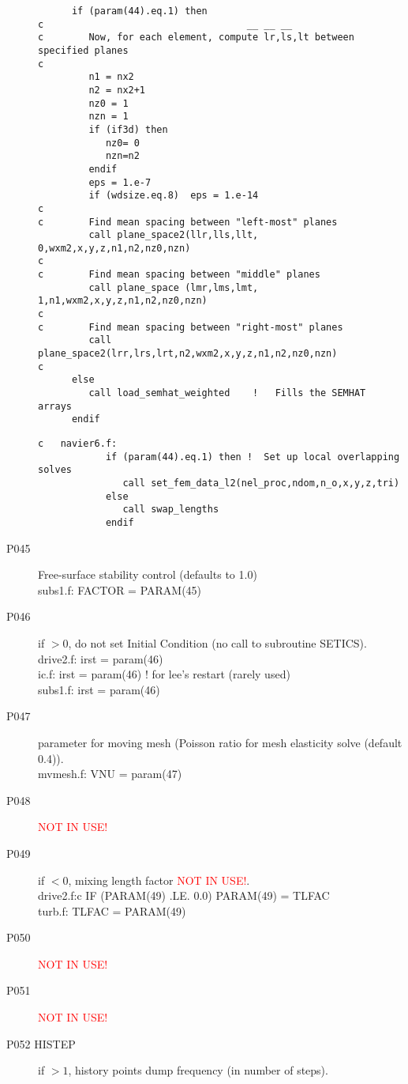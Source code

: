 \begin{description}
\begin{lstlisting}
      if (param(44).eq.1) then
c                                    __ __ __
c        Now, for each element, compute lr,ls,lt between specified planes
c
         n1 = nx2
         n2 = nx2+1
         nz0 = 1
         nzn = 1
         if (if3d) then
            nz0= 0
            nzn=n2
         endif
         eps = 1.e-7
         if (wdsize.eq.8)  eps = 1.e-14
c
c        Find mean spacing between "left-most" planes
         call plane_space2(llr,lls,llt, 0,wxm2,x,y,z,n1,n2,nz0,nzn)
c
c        Find mean spacing between "middle" planes
         call plane_space (lmr,lms,lmt, 1,n1,wxm2,x,y,z,n1,n2,nz0,nzn)
c
c        Find mean spacing between "right-most" planes
         call plane_space2(lrr,lrs,lrt,n2,wxm2,x,y,z,n1,n2,nz0,nzn)
c
      else
         call load_semhat_weighted    !   Fills the SEMHAT arrays
      endif
\end{lstlisting} 
\begin{lstlisting}
c   navier6.f:  
            if (param(44).eq.1) then !  Set up local overlapping solves 
               call set_fem_data_l2(nel_proc,ndom,n_o,x,y,z,tri)
            else
               call swap_lengths
            endif
\end{lstlisting} 
\item [P045  ] Free-surface stability control (defaults to 1.0)\\
subs1.f:      FACTOR = PARAM(45)
\item [P046  ] if \(>0\), do not set Initial Condition (no call to subroutine SETICS).\\
drive2.f:      irst = param(46)\\
ic.f:      irst = param(46)        ! for lee's restart (rarely used)\\
subs1.f:      irst = param(46)
\item [P047  ] parameter for moving mesh (Poisson ratio for mesh elasticity solve (default 0.4)).\\
mvmesh.f:      VNU    = param(47)
\item [P048  ] {\textcolor{red}{ NOT IN USE!}}
\item [P049  ] if \(<0\), mixing length factor {\textcolor{red}{ NOT IN USE!}}.\\
drive2.f:c     IF (PARAM(49) .LE. 0.0) PARAM(49) = TLFAC\\
turb.f:      TLFAC = PARAM(49)
\item [P050  ] {\textcolor{red}{ NOT IN USE!}}
\item [P051  ] {\textcolor{red}{ NOT IN USE!}}
\item [P052  HISTEP] if \(>1\), history points dump frequency (in number of steps).\\

\end{description}
